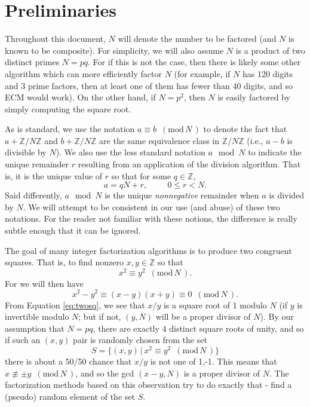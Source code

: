 \documentclass[12pt]{article}
\newcommand{\Z}{\mathbb{Z}}
\newcommand{\md}[1]{\,\,\, ( \mathrm{mod}\, #1 \,) }
\begin{document}
\section{Preliminaries}        \label{sec:prelim}

    Throughout this document, $N$ will denote
  the number to be factored (and $N$ is known to be composite).
  For simplicity, we will also assume $N$ is a product of two
  distinct primes $N=pq$.
  For if this is not the case, then there is likely
  some other algorithm which can more efficiently factor $N$ (for
  example, if $N$ has 120 digits and 3 prime factors, then at least
  one of them has fewer than 40 digits, and so ECM would work).
  On the other hand, if $N=p^2$, then $N$ is easily factored by
  simply computing the square root.

  As is standard, we use the notation $a\equiv b \md{N}$ to denote
  the fact that $a+\Z/N\Z$ and $b+\Z/N\Z$ are the same equivalence
  class in $\Z/N\Z$ (i.e., $a-b$ is divisible by $N$). We also use
  the less standard notation $a\mod N$ to indicate the unique remainder
  $r$ resulting from an application of the division algorithm.
  That is, it is the unique value of $r$ so that for some $q\in\Z$,
  \[
    a = qN + r, \hspace{1cm} 0\le r < N.
  \]
  Said differently, $a\mod N$ is the unique {\em nonnegative} remainder
  when $a$ is divided by $N$. We will attempt to be consistent in
  our use (and abuse) of these two notations. For the reader not familiar
  with these notions, the difference is really subtle enough that
  it can be ignored. 

  The goal of many integer factorization algorithms is to produce
  two congruent squares. That is, to find nonzero $x,y\in\Z$ so that
 \begin{equation} \label{eq:twosq}
    x^2 \equiv y^2 \md{N}.
 \end{equation}
  For we will then have
  \[
    x^2 - y^2 \equiv (x-y)(x+y) \equiv 0 \md{N}.
  \]
  From Equation \ref{eq:twosq}, we see that $x/y$ is a square root
  of 1 modulo $N$ (if $y$ is invertible modulo $N$; but if not,
  $(y,N)$ will be a proper divisor of $N$).
  By our assumption that $N=pq$, there are exactly 4 distinct square roots
  of unity, and so if such an $(x,y)$ pair is randomly chosen from the
  set 
  \[
    S = \{ (x,y) \,\vert\, x^2\equiv y^2 \md{N} \}
  \]
  there is about a 50/50 chance that $x/y$ is not
  one of 1,-1. This means that $x\not\equiv \pm y \md{N}$, and
  so the gcd $(x-y, N)$ is a proper divisor of $N$. The factorization
  methods based on this observation try to do exactly that - find a 
  (pseudo) random element of the set $S$.
\end{document}
